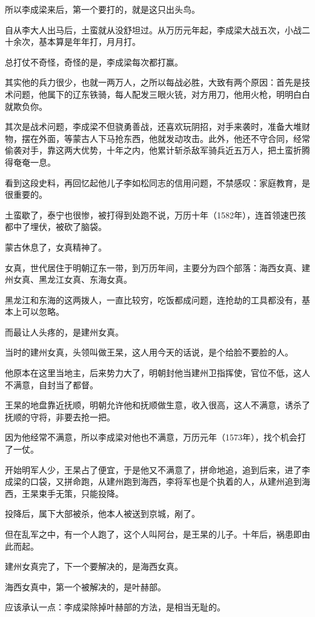 \begin{multicols}{\theparacolNo}
		所以李成梁来后，第一个要打的，就是这只出头鸟。

		自从李大人出马后，土蛮就从没舒坦过。从万历元年起，李成梁大战五次，小战二十余次，基本算是年年打，月月打。

		总打仗不奇怪，奇怪的是，李成梁每次都打赢。

		其实他的兵力很少，也就一两万人，之所以每战必胜，大致有两个原因：首先是技术问题，他属下的辽东铁骑，每人配发三眼火铳，对方用刀，他用火枪，明明白白就欺负你。

		其次是战术问题，李成梁不但骁勇善战，还喜欢玩阴招，对手来袭时，准备大堆财物，摆在外面，等蒙古人下马抢东西，他就发动攻击。此外，他还不守合同，经常偷袭对手，靠这两大优势，十年之内，他累计斩杀敌军骑兵近五万人，把土蛮折腾得奄奄一息。

		看到这段史料，再回忆起他儿子李如松同志的信用问题，不禁感叹：家庭教育，是很重要的。

		土蛮歇了，泰宁也很惨，被打得到处跑不说，万历十年（1582年），连首领速巴孩都中了埋伏，被砍了脑袋。

		蒙古休息了，女真精神了。

		女真，世代居住于明朝辽东一带，到万历年间，主要分为四个部落：海西女真、建州女真、黑龙江女真、东海女真。

		黑龙江和东海的这两拨人，一直比较穷，吃饭都成问题，连抢劫的工具都没有，基本上可以忽略。

		而最让人头疼的，是建州女真。

		当时的建州女真，头领叫做王杲，这人用今天的话说，是个给脸不要脸的人。

		他原本在这里当地主，后来势力大了，明朝封他当建州卫指挥使，官位不低，这人不满意，自封当了都督。

		王杲的地盘靠近抚顺，明朝允许他和抚顺做生意，收入很高，这人不满意，诱杀了抚顺的守将，非要去抢一把。

		因为他经常不满意，所以李成梁对他也不满意，万历元年（1573年），找个机会打了一仗。

		开始明军人少，王杲占了便宜，于是他又不满意了，拼命地追，追到后来，进了李成梁的口袋，又拼命跑，从建州跑到海西，李将军也是个执着的人，从建州追到海西，王杲束手无策，只能投降。

		投降后，属下大部被杀，他本人被送到京城，剐了。

		但在乱军之中，有一个人跑了，这个人叫阿台，是王杲的儿子。十年后，祸患即由此而起。

		建州女真完了，下一个要解决的，是海西女真。

		海西女真中，第一个被解决的，是叶赫部。

		应该承认一点：李成梁除掉叶赫部的方法，是相当无耻的。


\end{multicols}
